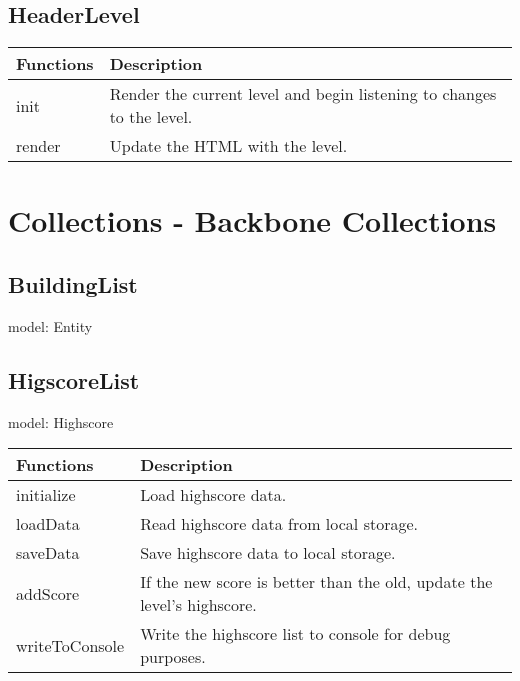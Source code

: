 \subsection*{HeaderLevel}

	\begin{table}[H]
	\begin{tabular}{p{4cm} | p{8cm} }
	\hline
	\rowcolor{gray}
	Functions & Description \\ \hline
	init & Render the current level and begin listening to changes to the level. \\ \hline
	render & Update the HTML with the level.  \\ \hline
	\end{tabular}
	\end{table}

\clearpage

\section{Collections - Backbone Collections}
	
\subsection*{BuildingList}

	model: Entity

\subsection*{HigscoreList}

	model: Highscore

	\begin{table}[H]
	\begin{tabular}{p{4cm} | p{8cm} }
	\hline
	\rowcolor{gray}
	Functions & Description \\ \hline
	initialize & Load highscore data. \\ \hline
	loadData & Read highscore data from local storage. \\ \hline
	saveData & Save highscore data to local storage. \\ \hline
	addScore & If the new score is better than the old, update the level's highscore. \\ \hline
	writeToConsole & Write the highscore list to console for debug purposes. \\ \hline

	\end{tabular}
	\end{table}	

